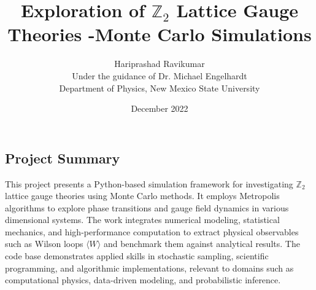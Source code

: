 \documentclass{article}
\title{Exploration of $\mathbb{Z}_2$ Lattice Gauge Theories -Monte Carlo Simulations}
\author{Hariprashad Ravikumar\\
Under the guidance of Dr. Michael Engelhardt \\
Department of Physics, New Mexico State University \\}
\date{December 2022}
\begin{document}
\maketitle
\begin{center}
\section*{Project Summary}
\end{center}
This project presents a Python-based simulation framework for investigating $\mathbb{Z}_2$ lattice gauge theories using Monte Carlo methods. It employs Metropolis algorithms to explore phase transitions and gauge field dynamics in various dimensional systems. The work integrates numerical modeling, statistical mechanics, and high-performance computation to extract physical observables such as Wilson loops $\langle W \rangle$ and benchmark them against analytical results. The code base demonstrates applied skills in stochastic sampling, scientific programming, and algorithmic implementations, relevant to domains such as computational physics, data-driven modeling, and probabilistic inference.



\tableofcontents
\end{document}
